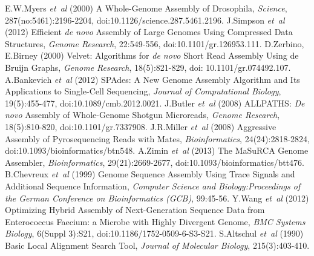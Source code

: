 \documentclass[12pt,a4paper]{cibb}
\begin{document}

{\fontsize{10}{10}\selectfont
\begin{thebibliography}{99}
\setlength{\parskip}{0pt}

 E.W.Myers \textit{et~al} (2000) A Whole-Genome Assembly of Drosophila, \textit{Science}, {287(no:5461)}:2196-2204, doi:10.1126/science.287.5461.2196.
 J.Simpson \textit{et~al} (2012) Efficient \textit{de novo} Assembly of Large Genomes Using Compressed Data Structures, \textit{Genome Research}, {22}:549-556, doi:10.1101/gr.126953.111.
 D.Zerbino, E.Birney (2000) Velvet: Algorithms for \textit{de novo} Short Read Assembly Using de Bruijn Graphs, \textit{Genome Research}, {18(5)}:821-829, doi: 10.1101/gr.074492.107.
 A.Bankevich {\it et~al} (2012) SPAdes: A New Genome Assembly Algorithm and Its Applications to Single-Cell Sequencing, \textit{Journal of Computational Biology}, {19(5)}:455-477, doi:10.1089/cmb.2012.0021.
 J.Butler \textit{et~al} (2008) ALLPATHS: \textit{De novo} Assembly of Whole-Genome Shotgun Microreads, {\it Genome Research}, {18(5)}:810-820, doi:10.1101/gr.7337908.
 J.R.Miller \textit{et~al} (2008) Aggressive Assembly of Pyrosequencing Reads with Mates, \textit{Bioinformatics}, {24(24)}:2818-2824, doi:10.1093/bioinformatics/btn548.
 A.Zimin \textit{et~al} (2013) The MaSuRCA Genome Assembler, \textit{Bioinformatics}, {29(21)}:2669-2677, doi:10.1093/bioinformatics/btt476.
 B.Chevreux {\it et~al} (1999) Genome Sequence Assembly Using Trace Signals and Additional Sequence Information, \textit{Computer Science and Biology:Proceedings of the German Conference on Bioinformatics (GCB)}, {99}:45-56.
 Y.Wang {\it et~al} (2012) Optimizing Hybrid Assembly of Next-Generation Sequence Data from Enterococcus Faecium: a Microbe with Highly Divergent Genome, \textit{BMC Systems Biology}, {6(Suppl 3)}:S21, doi:10.1186/1752-0509-6-S3-S21. 
 S.Altschul {\it et~al} (1990) Basic Local Alignment Search Tool, \textit{Journal of Molecular Biology}, {215(3)}:403-410.

\end{thebibliography}
}
\end{document}
